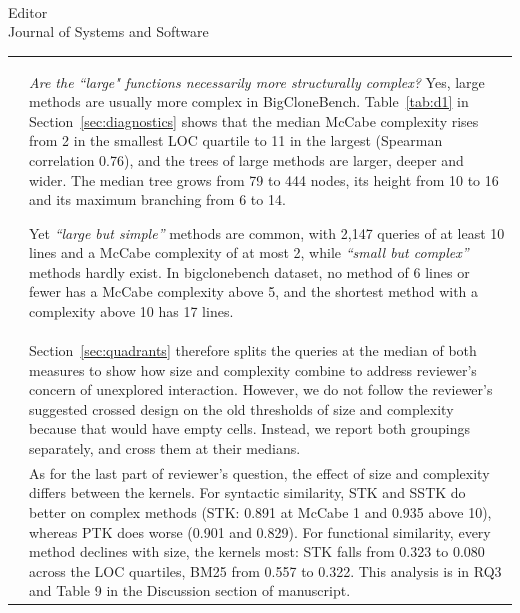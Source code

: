 \documentclass[
pagenumber=false, %
parskip=half, %
fromalign=right, %
foldmarks=false, %
addrfield=false %
]{scrlttr2}
\begin{document}
\begin{letter}{\\Editor\\Journal of Systems and Software}
\begin{longtable}{p{}p{}}
		& \textit{Are the ``large" functions necessarily more structurally complex?}
		Yes, large methods are usually more complex in BigCloneBench. Table~\ref{tab:d1} in Section~\ref{sec:diagnostics} shows that the median McCabe complexity rises from 2 in the smallest LOC quartile to 11 in the largest (Spearman correlation 0.76), and the trees of large methods are larger, deeper and wider. The median tree grows from 79 to 444 nodes, its height from 10 to 16 and its maximum branching from 6 to 14. 
		
		Yet \textit{``large but
		simple''} methods are common, with 2,147 queries of at least 10 lines and a McCabe complexity of at
		most 2, while \textit{``small but complex''} methods hardly exist. In bigclonebench dataset, no method of 6 lines or fewer has a McCabe
		complexity above 5, and the shortest
		method with a complexity above 10 has 17 lines. \\

		& Section~\ref{sec:quadrants} therefore splits the queries at the median of both measures to show how size and complexity combine to address reviewer's concern of unexplored interaction. However, we do not follow the reviewer's suggested crossed design on the old thresholds of size and complexity because that would
		have empty cells.  
		Instead, we report both groupings separately, and cross them at their medians.
		\\

		& As for the last part of reviewer's question, the effect of size and complexity differs between the kernels. For syntactic similarity, STK and SSTK do better on complex methods (STK: 0.891 at McCabe 1 and 0.935 above 10), whereas PTK does
		worse (0.901 and 0.829). For functional similarity, every method declines with size, the kernels
		most: STK falls from 0.323 to 0.080 across the LOC quartiles, BM25 from 0.557 to 0.322. This analysis is in RQ3 and Table 9 in the Discussion section of manuscript.\\ \midrule   
		

\end{longtable}
\end{letter}
\end{document}
